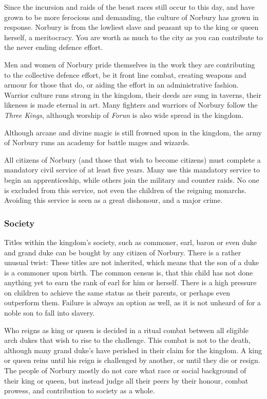 Since the incursion and raids of the beast races still occur to this day,
and have grown to be more ferocious and demanding, the culture of Norbury
has grown in response. Norbury is from the lowliest slave and peasant up
to the king or queen herself, a meritocracy. You are worth as much to the
city as you can contribute to the never ending defence effort.

Men and women of Norbury pride themselves in the work they are contributing to
the collective defence effort, be it front line combat, creating weapons and
armour for those that do, or aiding the effort in an administrative
fashion. Warrior culture runs strong in the kingdom, their deeds are sung in
taverns, their likeness is made eternal in art. Many fighters and warriors of
Norbury follow the \emph{Three Kings}, although worship of \emph{Forun} is also
wide spread in the kingdom.

Although arcane and divine magic is still frowned upon in the kingdom, the army
of Norbury runs an academy for battle mages and wizards.

All citizens of Norbury (and those that wish to become citizens) must complete
a mandatory civil service of at least five years. Many use this mandatory
service to begin an apprenticeship, while others join the military and counter
raids. No one is excluded from this service, not even the children of the
reigning monarchs. Avoiding this service is seen as a great dishonour, and a
major crime.

\subsubsection*{Society}

Titles within the kingdom's society, such as commoner, earl, baron or even
duke and grand duke can be bought by any citizen of Norbury. There is a rather
unusual twist: These titles are not inherited, which means that the son of a
duke is a commoner upon birth. The common census is, that this child has not
done anything yet to earn the rank of earl for him or herself. There is a high
pressure on children to achieve the same status as their parents, or perhaps
even outperform them. Failure is always an option as well, as it is not
unheard of for a noble son to fall into slavery.

Who reigns as king or queen is decided in a ritual combat between all eligible
arch dukes that wish to rise to the challenge. This combat is not to the
death, although many grand duke's have perished in their claim for the
kingdom. A king or queen reins until his reign is challenged by another, or
until they die or resign. The people of Norbury mostly do not care what race
or social background of their king or queen, but instead judge all their peers
by their honour, combat prowess, and contribution to society as a whole.

